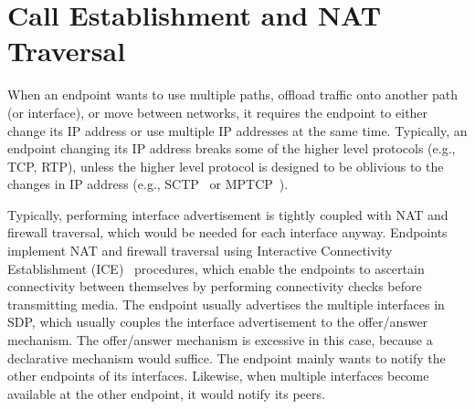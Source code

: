 \section{Call Establishment and NAT Traversal}

When an endpoint wants to use multiple paths, offload traffic onto another
path (or interface), or move between networks, it requires the endpoint to
either change its IP address or use multiple IP addresses at the same time.
Typically, an endpoint changing its IP address breaks some of the higher
level protocols (e.g., TCP, RTP), unless the higher level protocol is designed
to be oblivious to the changes in IP address (e.g., SCTP~\cite{rfc4960} or
MPTCP~\cite{rfc6824}).



Typically, performing interface advertisement is tightly coupled with NAT and
firewall traversal, which would be needed for each interface anyway. Endpoints
implement NAT and firewall traversal using Interactive Connectivity Establishment
(ICE)~\cite{rfc5245} procedures, which enable the endpoints to ascertain
connectivity between themselves by performing connectivity checks before
transmitting media. The endpoint usually advertises the multiple interfaces in
SDP, which usually couples the interface advertisement to the offer/answer
mechanism. The offer/answer mechanism is excessive in this case, because a
declarative mechanism would suffice. The endpoint mainly wants to notify the
other endpoints of its interfaces. Likewise, when multiple interfaces become
available at the other endpoint, it would notify its peers.

